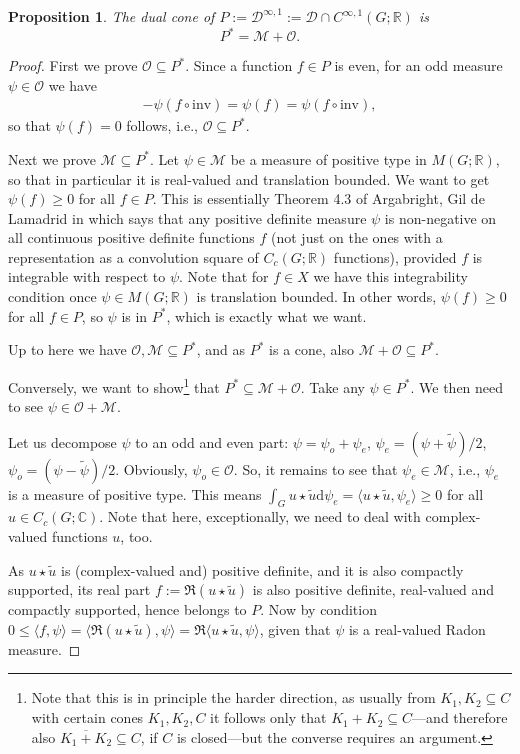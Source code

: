 \documentclass[[a4paper,english,12pt]{amsart}
\newcommand{\DX}{{\mathcal D}^{\infty,1}}
\newcommand{\wt}[1]{\widetilde{#1}}
\theoremstyle{plain}
\newtheorem{proposition}[theorem]{Proposition}
\theoremstyle{remark}
\newcommand{\DD}{{\mathcal D}}
\newcommand{\MM}{\mathcal{M}}
\newcommand{\OO}{\mathcal{O}}
\newcommand{\RR}{\mathbb R}
\newcommand{\CC}{\mathbb C}
\def\inv{\mathrm{inv}}
\def\dd{\mathrm{d}}
\begin{document}
\begin{proposition}\label{prop:Pdual}
The dual cone of $P:=\DX:=\DD\cap C^{\infty,1}(G;\RR)$ is
\[
P^*=\mathcal{M}+\mathcal{O}.
\]
\end{proposition}
\begin{proof}
First we prove $\OO \subseteq  P^*$. Since a function $f\in P$ is even, for an odd measure $\psi\in \mathcal{O}$  we have
\begin{align*}
-\psi(f\circ \inv)=\psi(f)=\psi(f\circ \inv),
\end{align*}
so that $\psi(f)=0$ follows, i.e., $\mathcal{O}\subseteq P^*$.

Next we prove $\MM \subseteq  P^*$. Let $\psi\in\mathcal{M}$ be a measure of positive type in $M(G;\RR)$, so that in particular it is real-valued and translation bounded. We want to get $\psi(f)\ge 0$ for all $f \in P$. This is essentially Theorem 4.3 of Argabright, Gil de Lamadrid in \cite{AG-Memoirs} which says that any positive definite measure $\psi$ is non-negative on all continuous positive definite functions $f$ (not just on the ones with a representation as a convolution square of $C_c(G;\RR)$ functions), provided $f$ is integrable with respect to $\psi$. Note that for $f \in X$ we have this integrability condition once $\psi \in M(G;\RR)$ is translation bounded. In other words, $\psi(f)\ge 0$ for all $f \in P$, so $\psi$ is in $P^*$, which is exactly what we want.

Up to here we have $\OO, \MM \subseteq  P^*$, and as  $P^*$ is a cone, also $\MM+\OO \subseteq  P^*$.

\medskip
Conversely, we want to show\footnote{Note that this is in principle the harder direction, as usually from $K_1, K_2 \subseteq  C$ with certain cones $K_1, K_2, C$ it follows only that $K_1+K_2 \subseteq  C$---and therefore also $\overline{K_1+K_2} \subseteq  C$, if $C$ is closed---but the converse requires an argument.} that $P^* \subseteq  \MM+\OO$. Take any $\psi\in P^*$.
We then need to see $\psi \in \OO + \MM$.

Let us decompose $\psi$ to an odd and even part: $\psi=\psi_o+\psi_e$, $\psi_e=(\psi+\wt\psi)/2$, $\psi_o=(\psi-\wt\psi)/2$. Obviously, $\psi_o \in \OO$. So, it remains to see that $\psi_e \in \MM$, i.e., $\psi_e$ is a measure of positive type. This means $\int_G u\star \wt u\dd\psi_e=\langle u \star \widetilde{u},\psi_e \rangle \ge 0$ for all $u \in C_c(G;\CC)$. Note that here, exceptionally, we need to deal with complex-valued functions $u$, too.

As $u \star \widetilde{u}$ is (complex-valued and) positive definite, and it is also compactly supported, its real part $f:= \Re (u \star \widetilde{u})$ is also positive definite, real-valued and compactly supported, hence belongs to $P$. Now by condition $0 \le \langle f, \psi\rangle = \langle \Re (u\star\widetilde{u}),\psi   \rangle = \Re \langle  u \star \widetilde{u},\psi \rangle$, given that $\psi$ is a real-valued Radon measure.


\end{proof}
\end{document}
